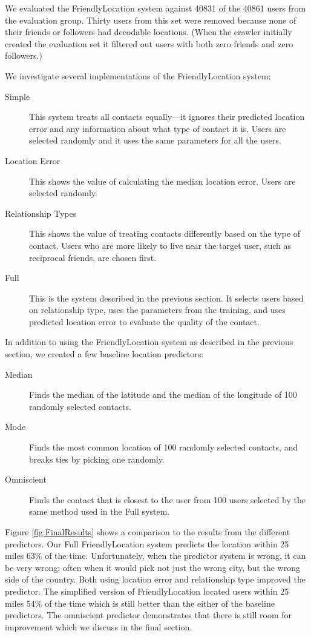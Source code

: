 We evaluated the FriendlyLocation system against 40831 of the 40861 users from
the evaluation group.
Thirty users from this set were removed because none of their friends or
followers had decodable locations.
(When the crawler initially created the evaluation set it filtered out users
with both zero friends and zero followers.)

We investigate several implementations of the FriendlyLocation system:
\begin{description}
\item[Simple] This system treats all contacts equally---it ignores their
predicted location error and any information about what type of contact it is.
Users are selected randomly and it uses the same parameters for all the users.
\item[Location Error] This shows the value of calculating the median location
error. Users are selected randomly.
\item[Relationship Types] This shows the value of treating contacts differently
based on the type of contact.
Users who are more likely to live near the target user, such as reciprocal
friends, are chosen first.
\item[Full] This is the system described in the previous section. It selects
users based on relationship type, uses the parameters from the training, and
uses predicted location error to evaluate the quality of the contact.
\end{description}

In addition to using the FriendlyLocation system as described in the previous
section, we created a few baseline location predictors:
\begin{description}
\item[Median] Finds the median of the latitude and the median of the longitude
of 100 randomly selected contacts.
\item[Mode] Finds the most common location of 100 randomly selected contacts,
and breaks ties by picking one randomly.
\item[Omniscient] Finds the contact that is closest to the user from 100 users
selected by the same method used in the Full system.
\end{description}

Figure \ref{fig:FinalResults} shows a comparison to the results from the 
different predictors.
Our Full FriendlyLocation system predicts the location within 25 miles 63\% of
the time.
Unfortunately, when the predictor system is wrong, it can be very wrong; often
when it would pick not just the wrong city, but the wrong side of the
country.
Both using location error and relationship type improved the predictor.  The
simplified version of FriendlyLocation located users within 25 miles 54\% of
the time which is still better than the either of the baseline predictors.
The omniscient predictor demonstrates that there is still room for improvement
which we discuss in the final section.

